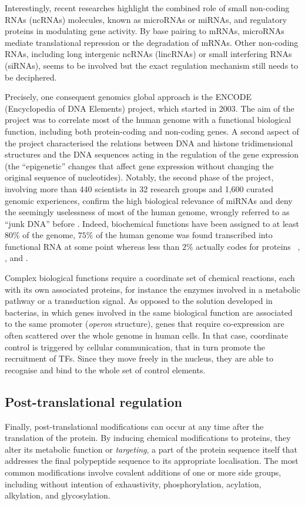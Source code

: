 Interestingly, recent researches highlight the combined role of small non-coding RNAs (ncRNAs) molecules, known as microRNAs or miRNAs, and regulatory proteins in modulating gene activity. By base pairing to mRNAs, microRNAs mediate translational repression or the degradation of mRNAs. 
Other non-coding RNAs, including long intergenic ncRNAs (lincRNAs) or small interfering RNAs (siRNAs), seems to be involved but the exact regulation mechanism still needs to be deciphered. 

Precisely, one consequent genomics global approach is the ENCODE (Encyclopedia of DNA Elements) project, which started in 2003. The aim of the project was to correlate most of the human genome with a functional biological function, including both protein-coding and non-coding genes. A second aspect of the project characterised the relations between DNA and histone tridimensional structures and the DNA sequences acting in the regulation of the gene expression (the \enquote{epigenetic} changes that affect gene expression without changing the original sequence of nucleotides). Notably, the second phase of the project, involving
more than 440 scientists in 32 research groups and 1,600 curated genomic experiences, confirm the high biological relevance of miRNAs and deny the seemingly uselessness of most of the human genome, wrongly referred to as \enquote{junk DNA} before . Indeed, biochemical functions have been assigned
to at least $80\%$ of the genome, $75\%$ of the human genome was found transcribed into functional RNA at some point whereas less than $2\%$ actually codes for proteins ~\autocite{desouza12}, \autocite{ecker_etal12}, \autocite{gerstein_etal07} and \autocite{snyder_etal20}.


Complex biological functions require a coordinate set of chemical reactions, each with its own associated proteins, for instance the enzymes involved in a metabolic pathway or a transduction signal. As opposed to the solution developed in bacterias, in which genes involved in the same biological function are associated to the same promoter (\textit{operon} structure), genes that require co-expression are often scattered over the whole genome in human cells. In that case, coordinate control is triggered by \gls{cellular communication}, that in turn promote the recruitment of TFs. Since they move freely in the nucleus,  they are able to recognise and bind to the whole set of control elements.



\subsection{Post-translational regulation}
\label{subsec:post-transla}
Finally, post-translational modifications can occur at any time after the translation of the protein. By inducing chemical modifications to proteins, they alter its metabolic function or \textit{targeting}, a part of the protein sequence itself that addresses the final polypeptide sequence to its appropriate localisation. The most common modifications involve covalent additions of one or more side groups, including without intention of exhaustivity, phosphorylation, acylation, alkylation, and glycosylation. 

